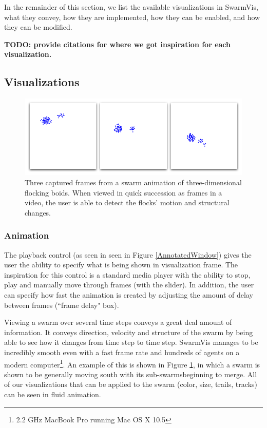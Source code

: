 \documentclass[conference]{IEEEtran}
\begin{document}
In the remainder of this section, we list the available visualizations in SwarmVis, what they convey, how they are implemented,
how they can be enabled, and how they can be modified.

\textbf{TODO: provide citations for where we got inspiration for each visualization.}


\subsection{Visualizations}





\begin{figure}
\centering
\includegraphics[scale=.282]{images/animation.png}
\caption{
Three captured frames from a swarm animation of three-dimensional flocking boids\cite{reynolds1987}.
When viewed in quick succession as frames in a video, the user
is able to detect the flocks' motion and structural changes.}
\label{Animation}
\end{figure}

\subsubsection{Animation}

The playback control (as seen in  seen in Figure \ref{AnnotatedWindow})
gives the user the ability to specify what is being shown in visualization frame.
The inspiration for this control is a standard media player with the ability to stop,
play and manually move through frames (with the slider).
In addition, the user can specify how fast the animation is created by adjusting the amount of delay between
frames (``frame delay" box).

Viewing a swarm over several time steps conveys a great deal amount of information. It conveys direction,
velocity and structure of the swarm by being able to see how it changes from time step to time step.
SwarmVis manages to be incredibly smooth even with a fast frame rate and hundreds of agents on a modern
computer\footnote{2.2 GHz MacBook Pro running Mac OS X 10.5}.
An example of this is shown in Figure \ref{Animation}, in which a swarm is shown to be
generally moving south with its sub-swarmsbeginning to merge.
All of our visualizations  that can be applied to the swarm (color, size, trails, tracks) can be seen in fluid animation.
\end{document}
